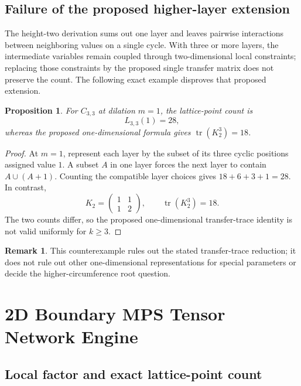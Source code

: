 \documentclass[11pt,a4paper]{article}
\newtheorem{proposition}[theorem]{Proposition}
\theoremstyle{definition}
\newtheorem{remark}[theorem]{Remark}
\begin{document}
\subsection{Failure of the proposed higher-layer extension}

The height-two derivation sums out one layer and leaves pairwise interactions between neighboring values on a single cycle. With three or more layers, the intermediate variables remain coupled through two-dimensional local constraints; replacing those constraints by the proposed single transfer matrix does not preserve the count. The following exact example disproves that proposed extension.

\begin{proposition}\label{prop:transfer-counterexample}
For $C_{3,3}$ at dilation $m=1$, the lattice-point count is
\[
L_{3,3}(1)=28,
\]
whereas the proposed one-dimensional formula gives $\operatorname{tr}(K_2^3)=18$.
\end{proposition}

\begin{proof}
At $m=1$, represent each layer by the subset of its three cyclic positions assigned value $1$. A subset $A$ in one layer forces the next layer to contain $A\cup(A+1)$. Counting the compatible layer choices gives $18+6+3+1=28$. In contrast,
\[
K_2=\begin{pmatrix}1&1\\1&2\end{pmatrix},
\qquad \operatorname{tr}(K_2^3)=18.
\]
The two counts differ, so the proposed one-dimensional transfer-trace identity is not valid uniformly for $k\ge3$.
\end{proof}

\begin{remark}
This counterexample rules out the stated transfer-trace reduction; it does not rule out other one-dimensional representations for special parameters or decide the higher-circumference root question.
\end{remark}

\section{2D Boundary MPS Tensor Network Engine}

\subsection{Local factor and exact lattice-point count}
\end{document}
